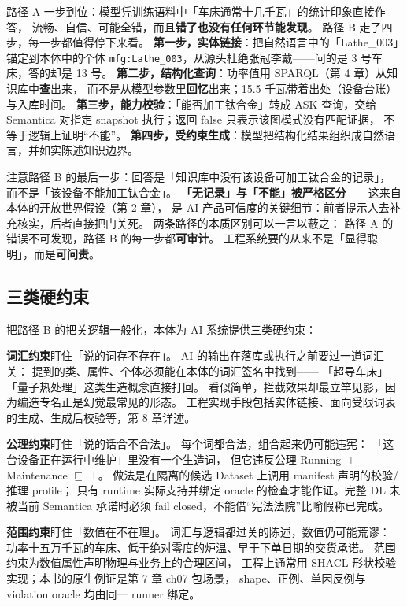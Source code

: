 

路径 A 一步到位：模型凭训练语料中「车床通常十几千瓦」的统计印象直接作答，
流畅、自信、可能全错，而且\textbf{错了也没有任何环节能发现}。
路径 B 走了四步，每一步都值得停下来看。
\textbf{第一步，实体链接}：把自然语言中的「Lathe\_003」锚定到本体中的个体
\texttt{mfg:Lathe\_003}，从源头杜绝张冠李戴——问的是 3 号车床，答的却是 13 号。
\textbf{第二步，结构化查询}：功率值用 SPARQL（第 4 章）从知识库中\textbf{查}出来，
而不是从模型参数里\textbf{回忆}出来；15.5 千瓦带着出处（设备台账）与入库时间。
\textbf{第三步，能力校验}：「能否加工钛合金」转成 ASK 查询，交给
Semantica 对指定 snapshot 执行；返回 false 只表示该图模式没有匹配证据，
不等于逻辑上证明“不能”。
\textbf{第四步，受约束生成}：模型把结构化结果组织成自然语言，并如实陈述知识边界。

注意路径 B 的最后一步：回答是「知识库中没有该设备可加工钛合金的记录」，
而不是「该设备不能加工钛合金」。
\textbf{「无记录」与「不能」被严格区分}——这来自本体的开放世界假设（第 2 章），
是 AI 产品可信度的关键细节：前者提示人去补充核实，后者直接把门关死。
两条路径的本质区别可以一言以蔽之：
路径 A 的错误不可发现，路径 B 的每一步都\textbf{可审计}。
工程系统要的从来不是「显得聪明」，而是\textbf{可问责}。

\subsection{三类硬约束}

把路径 B 的把关逻辑一般化，本体为 AI 系统提供三类硬约束：



\textbf{词汇约束}盯住「说的词存不存在」。
AI 的输出在落库或执行之前要过一道词汇关：
提到的类、属性、个体必须能在本体的词汇签名中找到——
「超导车床」「量子热处理」这类生造概念直接打回。
看似简单，拦截效果却最立竿见影，因为编造专名正是幻觉最常见的形态。
工程实现手段包括实体链接、面向受限词表的生成、生成后校验等，第 8 章详述。

\textbf{公理约束}盯住「说的话合不合法」。
每个词都合法，组合起来仍可能违宪：
「这台设备正在运行中维护」里没有一个生造词，
但它违反公理 Running \(\sqcap\) Maintenance \(\sqsubseteq\) \(\bot\)。
做法是在隔离的候选 Dataset 上调用 manifest 声明的校验/推理 profile；
只有 runtime 实际支持并绑定 oracle 的检查才能作证。完整 DL 未被当前 Semantica
承诺时必须 fail closed，不能借“宪法法院”比喻假称已完成。

\textbf{范围约束}盯住「数值在不在理」。
词汇与逻辑都过关的陈述，数值仍可能荒谬：
功率十五万千瓦的车床、低于绝对零度的炉温、早于下单日期的交货承诺。
范围约束为数值属性声明物理与业务上的合理区间，
工程上通常用 SHACL 形状校验实现；本书的原生例证是第 7 章 ch07 包场景，
shape、正例、单因反例与 violation oracle 均由同一 runner 绑定。

